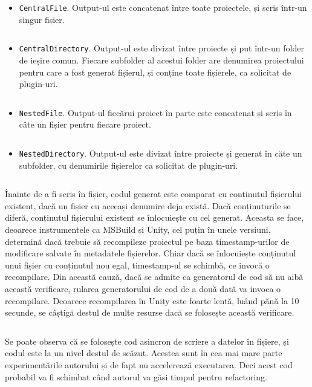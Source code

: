 \documentclass[a4paper,12pt]{report}
\begin{document}
\begin{itemize}
\item \texttt{CentralFile}. Output-ul este concatenat între toate proiectele, și scris într-un singur fișier.
\inputminted[firstline=1114, lastline=1129]{cs}{../Kari/source/Kari.GeneratorCore/Workflow/MasterEnvironment.cs}

\item \texttt{CentralDirectory}. Output-ul este divizat între proiecte și put într-un folder de ieșire comun.
  Fiecare subfolder al acestui folder are denumirea proiectului pentru care a fost generat fișierul, și conține toate fișierele, ca solicitat de plugin-uri.
\inputminted[firstline=1064, lastline=1080]{cs}{../Kari/source/Kari.GeneratorCore/Workflow/MasterEnvironment.cs}

\item \texttt{NestedFile}. Output-ul fiecărui proiect în parte este concatenat și scris în câte un fișier pentru fiecare proiect.
\inputminted[firstline=1131, lastline=1145]{cs}{../Kari/source/Kari.GeneratorCore/Workflow/MasterEnvironment.cs}

\item \texttt{NestedDirectory}. Output-ul este divizat între proiecte și generat în căte un subfolder, cu denumirile fișierelor ca solicitat de plugin-uri.
\inputminted[firstline=1040, lastline=1057]{cs}{../Kari/source/Kari.GeneratorCore/Workflow/MasterEnvironment.cs}
\end{itemize}

Înainte de a fi scris în fișier, codul generat este comparat cu conținutul fișierului existent, dacă un fișier cu aceeași denumire deja există.
Dacă conținuturile se diferă, conținutul fișierului existent se înlocuiește cu cel generat.
Aceasta se face, deoarece instrumentele ca MSBuild și Unity, cel puțin în unele versiuni, determină dacă trebuie să recompileze proiectul pe baza timestamp-urilor de modificare salvate în metadatele fișierelor.
Chiar dacă se înlocuiește conținutul unui fișier cu conținutul nou egal, timestamp-ul se schimbă, ce invocă o recompilare.
Din această cauză, dacă se admite ca generatorul de cod să nu aibă această verificare, rularea generatorului de cod de a două dată va invoca o recompilare.
Deoarece recompilarea în Unity este foarte lentă, luând pănă la 10 secunde, se câștigă destul de multe resurse dacă se folosește această verificare.
\inputminted[firstline=950, lastline=972]{cs}{../Kari/source/Kari.GeneratorCore/Workflow/MasterEnvironment.cs}

Se poate observa că se folosește cod asincron de scriere a datelor în fișiere, și codul este la un nivel destul de scăzut.
Acestea sunt în cea mai mare parte experimentările autorului și de fapt nu accelerează executarea.
Deci acest cod probabil va fi schimbat când autorul va găsi timpul pentru refactoring.
\end{document}

